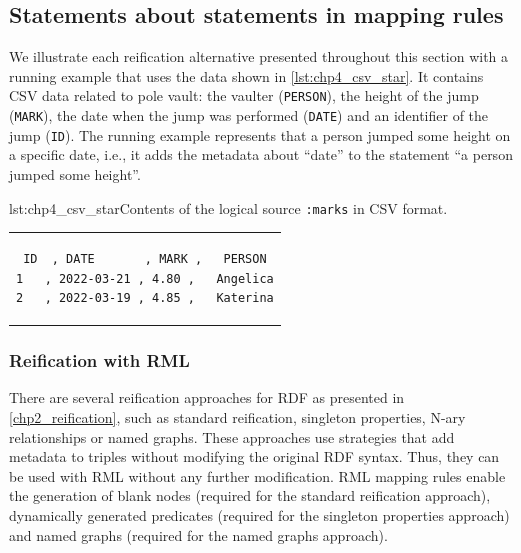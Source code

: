 
\subsection{Statements about statements in mapping rules}
\label{sec:chp4_reif_mappings}

We illustrate each reification alternative presented throughout this section with a running example that uses the data shown in \cref{lst:chp4_csv_star}.
It contains CSV data related to pole vault:
the vaulter (\texttt{PERSON}),
the height of the jump (\texttt{MARK}),
the date when the jump was performed (\texttt{DATE}) and
an identifier of the jump (\texttt{ID}).
The running example represents
that a person jumped some height on a specific date, i.e., it adds the metadata about ``date''
to the statement ``a person jumped some height''.

\noindent\hspace{0.15\linewidth}\begin{minipage}{\linewidth}
\begin{captionedlisting}{lst:chp4_csv_star}{Contents of the logical source \texttt{:marks} in CSV format.}
\centering
\begin{tabular}{c}
\hspace{3em}
{\begin{lstlisting}[basicstyle=\ttfamily\small,label={list:example1},columns=flexible]
ID  , DATE       , MARK ,   PERSON
1   , 2022-03-21 , 4.80 ,   Angelica
2   , 2022-03-19 , 4.85 ,   Katerina
\end{lstlisting}}
\end{tabular}
\end{captionedlisting}
\end{minipage}

\subsubsection{Reification with RML}

There are several reification approaches for RDF as presented in \cref{chp2_reification}, such as standard reification, singleton properties, N-ary relationships or named graphs. 
These approaches use strategies that add metadata to triples
without modifying the original RDF syntax.
Thus, they can be used with RML without any further modification. RML mapping rules enable the generation of blank nodes (required for the standard reification approach), dynamically generated predicates (required for the singleton properties approach) and named graphs (required for the named graphs approach). %

